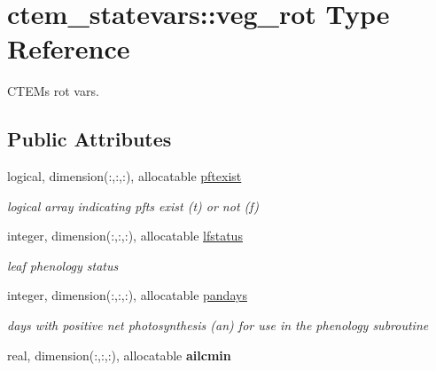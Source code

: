 \hypertarget{structctem__statevars_1_1veg__rot}{}\section{ctem\+\_\+statevars\+:\+:veg\+\_\+rot Type Reference}
\label{structctem__statevars_1_1veg__rot}


C\+T\+E\+M\textquotesingle{}s \textquotesingle{}rot\textquotesingle{} vars.  


\subsection*{Public Attributes}
\begin{DoxyCompactItemize}
\item 
\hypertarget{structctem__statevars_1_1veg__rot_a3baef80763a7f54e00c3e90e4999da1b}{}logical, dimension(\+:,\+:,\+:), allocatable \hyperlink{structctem__statevars_1_1veg__rot_a3baef80763a7f54e00c3e90e4999da1b}{pftexist}\label{structctem__statevars_1_1veg__rot_a3baef80763a7f54e00c3e90e4999da1b}

\begin{DoxyCompactList}\small\item\em logical array indicating pfts exist (t) or not (f) \end{DoxyCompactList}\item 
\hypertarget{structctem__statevars_1_1veg__rot_aba3a27482e8bcfcab7e241defa7b9038}{}integer, dimension(\+:,\+:,\+:), allocatable \hyperlink{structctem__statevars_1_1veg__rot_aba3a27482e8bcfcab7e241defa7b9038}{lfstatus}\label{structctem__statevars_1_1veg__rot_aba3a27482e8bcfcab7e241defa7b9038}

\begin{DoxyCompactList}\small\item\em leaf phenology status \end{DoxyCompactList}\item 
\hypertarget{structctem__statevars_1_1veg__rot_aa1d6ab95d92bdbff099f7cb51ef7ea1f}{}integer, dimension(\+:,\+:,\+:), allocatable \hyperlink{structctem__statevars_1_1veg__rot_aa1d6ab95d92bdbff099f7cb51ef7ea1f}{pandays}\label{structctem__statevars_1_1veg__rot_aa1d6ab95d92bdbff099f7cb51ef7ea1f}

\begin{DoxyCompactList}\small\item\em days with positive net photosynthesis (an) for use in the phenology subroutine \end{DoxyCompactList}\item 
\hypertarget{structctem__statevars_1_1veg__rot_a22678a0ad2d1d968908c06f5b67cc738}{}real, dimension(\+:,\+:,\+:), allocatable {\bfseries ailcmin}\label{structctem__statevars_1_1veg__rot_a22678a0ad2d1d968908c06f5b67cc738}


\end{DoxyCompactItemize}
